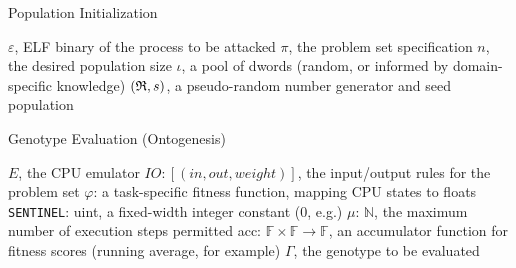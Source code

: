 \documentclass[12pt,glossary]{dalthesis}
\begin{document}
\begin{algorithm}
\caption{Population Initialization}
\label{alg:initpop}
\begin{algorithmic}[1]
\REQUIRE $\varepsilon$, ELF binary of the process to be attacked
\REQUIRE $\pi$, the problem set specification
\REQUIRE $n$, the desired population size
\REQUIRE $\iota$, a pool of dwords (random, or informed by domain-specific knowledge)
\REQUIRE $(\frak{R},s)$, a pseudo-random number generator and seed
 
\label{alg:initpop:line:spawn-individual}
\ENDFOR
\RETURN population
\end{algorithmic}
\end{algorithm}


\begin{algorithm}
\caption{Genotype Evaluation (Ontogenesis)}
\label{alg:evalgen}
\begin{algorithmic}[1]
\REQUIRE $E$, the CPU emulator
\REQUIRE $IO: [(in, out, weight)]$, the input/output rules for the problem set
\REQUIRE $\varphi$: a task-specific fitness function, mapping CPU states to floats
\REQUIRE \texttt{SENTINEL}: uint, a fixed-width integer constant (0, e.g.)
\REQUIRE $\mu$: $\mathbb{N}$, the maximum number of execution steps permitted
\REQUIRE acc: $\mathbb{F} \times \mathbb{F} \rightarrow \mathbb{F}$, an accumulator function for fitness scores (running average, for example)
\REQUIRE $\Gamma$, the genotype to be evaluated
  
  
 
\ENDWHILE
{}
\ENDFOR 
{}
\end{algorithmic}
\end{algorithm}
\end{document}
